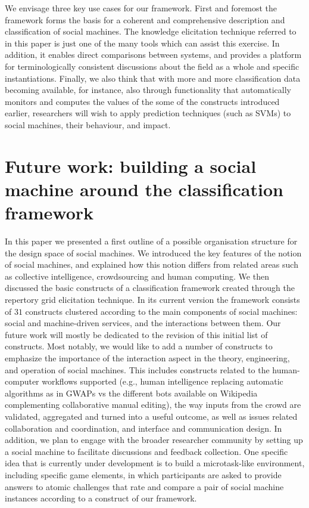 \documentclass{sig-alternate}
\begin{document}
We envisage three key use cases for our framework. First and foremost the framework forms the basis for a coherent and comprehensive description and classification of social machines. The knowledge elicitation technique referred to in this paper is just one of the many tools which can assist this exercise. In addition, it enables direct comparisons between systems, and provides a platform for terminologically consistent discussions about the field as a whole and specific instantiations. Finally, we also think that with more and more classification data becoming available, for instance, also through functionality that automatically monitors and computes the values of the some of the constructs introduced earlier, researchers will wish to apply prediction techniques (such as SVMs) to social machines, their behaviour, and impact.

\section{Future work: building a social machine around the classification framework}
In this paper we presented a first outline of a possible organisation structure for the design space of social machines. We introduced the key features of the notion of social machines, and explained how this notion differs from related areas such as collective intelligence, crowdsourcing and human computing. We then discussed the basic constructs of a classification framework created through the repertory grid elicitation technique. In its current version the framework consists of $31$ constructs clustered according to the main components of social machines: social and machine-driven services, and the interactions between them. Our future work will mostly be dedicated to the revision of this initial list of constructs. Most notably, we would like to add a number of constructs to emphasize the importance of the interaction aspect in the theory, engineering, and operation of social machines. This includes constructs related to the human-computer workflows supported (e.g., human intelligence replacing automatic algorithms as in GWAPs vs the different bots available on Wikipedia complementing collaborative manual editing), the way inputs from the crowd are validated, aggregated and turned into a useful outcome, as well as issues related collaboration and coordination, and interface and communication design. In addition, we plan to engage with the broader researcher community by setting up a social machine to facilitate discussions and feedback collection. One specific idea that is currently under development is to build a microtask-like environment, including specific game elements, in which participants are asked to provide answers to atomic challenges that rate and compare a pair of social machine instances according to a construct of our framework.
\end{document}
